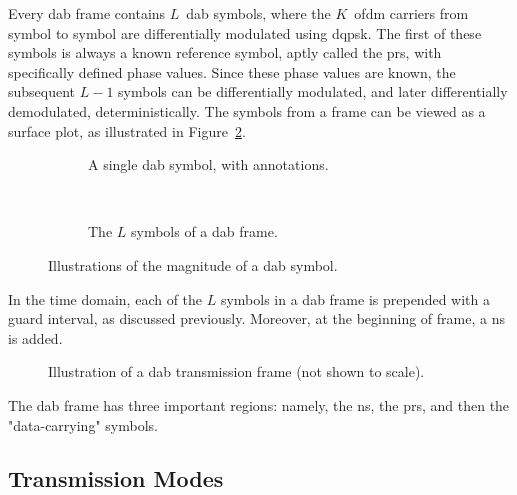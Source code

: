 \documentclass[class=report,11pt,crop=false]{standalone}
\begin{document}
Every \gls{dab} frame contains \(L\)~\gls{dab} symbols, where the \(K\)~\gls{ofdm} carriers from symbol to symbol are differentially modulated using \gls{dqpsk}. The first of these symbols is always a known reference symbol, aptly called the \gls{prs}, with specifically defined phase values. Since these phase values are known, the subsequent \(L-1\) symbols can be differentially modulated, and later differentially demodulated, deterministically. The symbols from a frame can be viewed as a surface plot, as illustrated in Figure~\ref{fig:dab-surface-diagram}.
\begin{figure}[htbp]
    \centering
    \captionsetup{type=figure}
    \begin{subfigure}[t]{0.47\textwidth}
        \centering
        \def\svgwidth{1\linewidth}
        {\scriptsize
            }
        \caption{A single \gls{dab} symbol, with annotations.}
        \label{fig:dab-single-symbol-diagram}
    \end{subfigure}%
    ~ 
    \begin{subfigure}[t]{0.52\textwidth}
        \def\svgwidth{1\linewidth}
        {\scriptsize
            }
        \caption{The \(L\) symbols of a \gls{dab} frame.}
        \label{fig:dab-surface-diagram}
    \end{subfigure}
    \caption{Illustrations of the magnitude of a \gls{dab} symbol.}
    \label{ig:dab-symbol-diagrams}
\end{figure}

In the time domain, each of the \(L\) symbols in a \gls{dab} frame is prepended with a guard interval, as discussed previously. Moreover, at the beginning of frame, a \gls{ns} is added.

\begin{figure}[htbp]
    \centering
    \captionsetup{type=figure}
    \def\svgwidth{1\linewidth}
    { %
    \scriptsize
    }
    \caption{Illustration of a \gls{dab} transmission frame (not shown to scale).}
    \label{fig:transmission-frame-illustration}
\end{figure}

The \gls{dab} frame has three important regions: namely, the \gls{ns}, the \gls{prs}, and then the "data-carrying" symbols.

\subsection{Transmission Modes}
\end{document}

